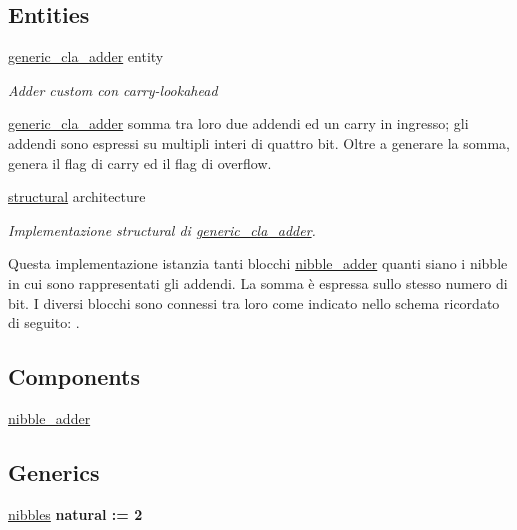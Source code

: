 \subsection*{Entities}
\begin{DoxyCompactItemize}
\item 
\hyperlink{classgeneric__cla__adder}{generic\+\_\+cla\+\_\+adder} entity
\begin{DoxyCompactList}\small\item\em Adder custom con carry-\/lookahead

\hyperlink{classgeneric__cla__adder}{generic\+\_\+cla\+\_\+adder} somma tra loro due addendi ed un carry in ingresso; gli addendi sono espressi su multipli interi di quattro bit. Oltre a generare la somma, genera il flag di carry ed il flag di overflow. \end{DoxyCompactList}\item 
\hyperlink{classgeneric__cla__adder_1_1structural}{structural} architecture
\begin{DoxyCompactList}\small\item\em Implementazione structural di \hyperlink{classgeneric__cla__adder}{generic\+\_\+cla\+\_\+adder}.

Questa implementazione istanzia tanti blocchi \hyperlink{classnibble__adder}{nibble\+\_\+adder} quanti siano i nibble in cui sono rappresentati gli addendi. La somma è espressa sullo stesso numero di bit. I diversi blocchi sono connessi tra loro come indicato nello schema ricordato di seguito\+: . \end{DoxyCompactList}\end{DoxyCompactItemize}
\subsection*{Components}
 \begin{DoxyCompactItemize}
\item 
\hyperlink{group___carry_loockahead_ga98a3a5b152caf0f2de1e31ac60088369}{nibble\+\_\+adder}  {\bfseries }  
\end{DoxyCompactItemize}
\subsection*{Generics}
 \begin{DoxyCompactItemize}
\item 
\hyperlink{group___carry_loockahead_ga0b63b586531492d0fa882246cca071c1}{nibbles} {\bfseries {\bfseries \textcolor{vhdlchar}{natural}\textcolor{vhdlchar}{ }\textcolor{vhdlchar}{ }\textcolor{vhdlchar}{\+:}\textcolor{vhdlchar}{=}\textcolor{vhdlchar}{ }\textcolor{vhdlchar}{ } \textcolor{vhdldigit}{2} \textcolor{vhdlchar}{ }}}
\end{DoxyCompactItemize}
